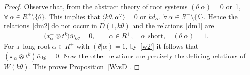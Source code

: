 \documentclass[10pt,a4paper]{amsart}
\begin{document}
\begin{proof}
Observe that, from the abstract theory of root systems $(\theta|\alpha)= 0$ or~1,
$\forall\, \alpha \in R^{+}\setminus \{\theta\}$.
This implies that $\langle k\theta, \alpha^{\vee}\rangle = 0$ or $kd_{\alpha}$, $\forall\, \alpha \in R^{+}\setminus \{\theta\}$.
Hence the relations~\eqref{dm2} do not occur in $D(1,k\theta)$ and the relations~\eqref{dm1} are
\begin{gather*}
\big(x^{-}_{\alpha} \otimes t^k\big) \overline{w}_{k\theta}=0,
\qquad
\alpha\in R^+,
\quad
\alpha~~\text{short},
\quad
(\theta|\alpha)=1.
\end{gather*}
For a~long root $\alpha\in R^+$ with $(\theta|\alpha)=1$, by~\eqref{w2'} it follows that $(x^{-}_{\alpha} \otimes t^k) \overline{w}_{k\theta}=0$.
Now the other relations are precisely the def\/ining relations of $W(k\theta)$. This proves Proposition~\ref{WvsD}.
\end{proof}
\end{document}
